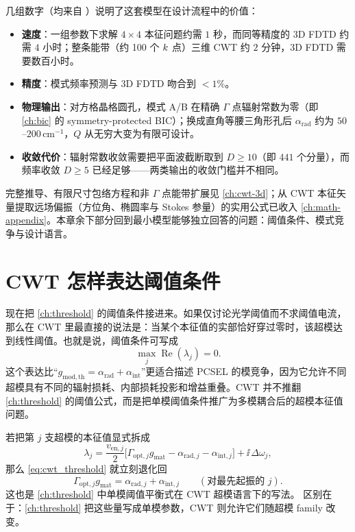 几组数字（均来自 \cite{liang2012square}）说明了这套模型在设计流程中的价值：
\begin{itemize}
  \item \textbf{速度}：一组参数下求解 $4\times4$ 本征问题约需 $1$ 秒，而同等精度的 3D FDTD 约需 $4$ 小时；整条能带（约 100 个 $k$ 点）三维 CWT 约 $2$ 分钟，3D FDTD 需要数百小时。
  \item \textbf{精度}：模式频率预测与 3D FDTD 吻合到 $<1\%$。
  \item \textbf{物理输出}：对方格晶格圆孔，模式 A/B 在精确 $\Gamma$ 点辐射常数为零（即 \cref{ch:bic} 的 symmetry-protected BIC）；换成直角等腰三角形孔后 $\alpha_{\mathrm{rad}}$ 约为 $50$--$200\,\mathrm{cm}^{-1}$，$Q$ 从无穷大变为有限可设计。
  \item \textbf{收敛代价}：辐射常数收敛需要把平面波截断取到 $D\geq 10$（即 $441$ 个分量），而频率收敛 $D\geq 5$ 已经足够——两类输出的收敛门槛并不相同。
\end{itemize}

完整推导、有限尺寸包络方程和非 $\Gamma$ 点能带扩展见 \cref{ch:cwt-3d}；从 CWT 本征矢量提取远场偏振（方位角、椭圆率与 Stokes 参量）的实用公式已收入 \cref{ch:math-appendix}。本章余下部分回到最小模型能够独立回答的问题：阈值条件、模式竞争与设计语言。


\section{CWT 怎样表达阈值条件}
现在把 \cref{ch:threshold} 的阈值条件接进来。如果仅讨论光学阈值而不求阈值电流，那么在 CWT 里最直接的说法是：当某个本征值的实部恰好穿过零时，该超模达到线性阈值。也就是说，阈值条件可写成
\begin{equation}
\max_j \operatorname{Re}(\lambda_j)=0.
\label{eq:cwt_threshold}
\end{equation}
这个表达比“$g_{\mathrm{mod,th}}=\alpha_{\mathrm{rad}}+\alpha_{\mathrm{int}}$”更适合描述 PCSEL 的模竞争，因为它允许不同超模具有不同的辐射损耗、内部损耗投影和增益重叠。CWT 并不推翻 \cref{ch:threshold} 的阈值公式，而是把单模阈值条件推广为多模耦合后的超模本征值问题。

若把第 $j$ 支超模的本征值显式拆成
\begin{equation}
\lambda_j
=
\frac{v_{\mathrm{en},j}}{2}
\bigl[
\Gamma_{\mathrm{opt},j}g_{\mathrm{mat}}
-\alpha_{\mathrm{rad},j}
-\alpha_{\mathrm{int},j}
\bigr]
+ \ii\,\Delta\omega_j,
\label{eq:cwt_threshold_bridge}
\end{equation}
那么 \cref{eq:cwt_threshold} 就立刻退化回
\begin{equation}
\Gamma_{\mathrm{opt},j}g_{\mathrm{mat}}
=
\alpha_{\mathrm{rad},j}
+\alpha_{\mathrm{int},j}
\qquad
(\text{对最先起振的 }j).
\label{eq:cwt_threshold_bridge_scalar}
\end{equation}
这也是 \cref{ch:threshold} 中单模阈值平衡式在 CWT 超模语言下的写法。
区别在于：\cref{ch:threshold} 把这些量写成单模参数，CWT 则允许它们随超模 family 改变。

